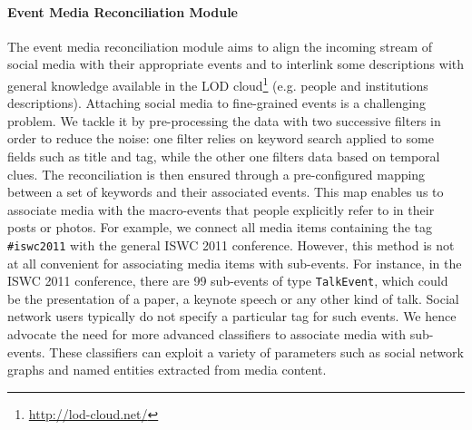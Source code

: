 \paragraph{Event Media Reconciliation Module}
The event media reconciliation module aims to align the incoming stream of social media with their appropriate events and to interlink some descriptions with general knowledge available in the LOD cloud\footnote{\url{http://lod-cloud.net/}} (e.g. people and institutions descriptions). Attaching social media to fine-grained events is a challenging problem. We tackle it by pre-processing the data with two successive filters in order to reduce the noise: one filter relies on keyword search applied to some fields such as title and tag, while the other one filters data based on temporal clues. The reconciliation is then ensured through a pre-configured mapping between a set of keywords and their associated events. This map enables us to associate media with the macro-events that people explicitly refer to in their posts or photos. For example, we connect all media items containing the tag \texttt{\#iswc2011} with the general ISWC 2011 conference. However, this method is not at all convenient for associating media items with sub-events. For instance, in the ISWC 2011 conference, there are 99 sub-events of type \texttt{TalkEvent}, which could be the presentation of a paper, a keynote speech or any other kind of talk. Social network users typically do not specify a particular tag for such events. We hence advocate the need for more advanced classifiers to associate media with sub-events. These classifiers can exploit a variety of parameters such as social network graphs and named entities extracted from media content.

